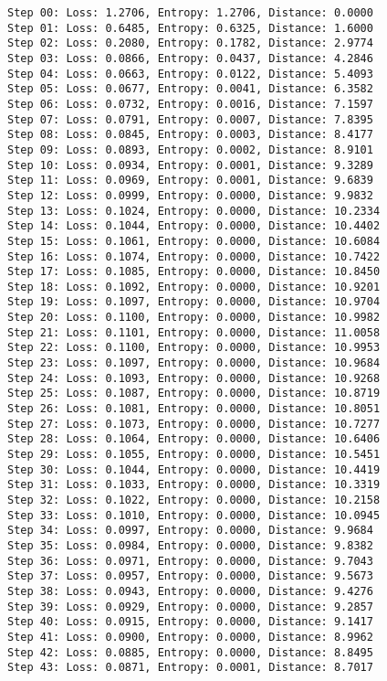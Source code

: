 \documentclass[11pt]{article}
\begin{document}
    \begin{Verbatim}[commandchars=\\\{\}]
Step 00: Loss: 1.2706, Entropy: 1.2706, Distance: 0.0000
Step 01: Loss: 0.6485, Entropy: 0.6325, Distance: 1.6000
Step 02: Loss: 0.2080, Entropy: 0.1782, Distance: 2.9774
Step 03: Loss: 0.0866, Entropy: 0.0437, Distance: 4.2846
Step 04: Loss: 0.0663, Entropy: 0.0122, Distance: 5.4093
Step 05: Loss: 0.0677, Entropy: 0.0041, Distance: 6.3582
Step 06: Loss: 0.0732, Entropy: 0.0016, Distance: 7.1597
Step 07: Loss: 0.0791, Entropy: 0.0007, Distance: 7.8395
Step 08: Loss: 0.0845, Entropy: 0.0003, Distance: 8.4177
Step 09: Loss: 0.0893, Entropy: 0.0002, Distance: 8.9101
Step 10: Loss: 0.0934, Entropy: 0.0001, Distance: 9.3289
Step 11: Loss: 0.0969, Entropy: 0.0001, Distance: 9.6839
Step 12: Loss: 0.0999, Entropy: 0.0000, Distance: 9.9832
Step 13: Loss: 0.1024, Entropy: 0.0000, Distance: 10.2334
Step 14: Loss: 0.1044, Entropy: 0.0000, Distance: 10.4402
Step 15: Loss: 0.1061, Entropy: 0.0000, Distance: 10.6084
Step 16: Loss: 0.1074, Entropy: 0.0000, Distance: 10.7422
Step 17: Loss: 0.1085, Entropy: 0.0000, Distance: 10.8450
Step 18: Loss: 0.1092, Entropy: 0.0000, Distance: 10.9201
Step 19: Loss: 0.1097, Entropy: 0.0000, Distance: 10.9704
Step 20: Loss: 0.1100, Entropy: 0.0000, Distance: 10.9982
Step 21: Loss: 0.1101, Entropy: 0.0000, Distance: 11.0058
Step 22: Loss: 0.1100, Entropy: 0.0000, Distance: 10.9953
Step 23: Loss: 0.1097, Entropy: 0.0000, Distance: 10.9684
Step 24: Loss: 0.1093, Entropy: 0.0000, Distance: 10.9268
Step 25: Loss: 0.1087, Entropy: 0.0000, Distance: 10.8719
Step 26: Loss: 0.1081, Entropy: 0.0000, Distance: 10.8051
Step 27: Loss: 0.1073, Entropy: 0.0000, Distance: 10.7277
Step 28: Loss: 0.1064, Entropy: 0.0000, Distance: 10.6406
Step 29: Loss: 0.1055, Entropy: 0.0000, Distance: 10.5451
Step 30: Loss: 0.1044, Entropy: 0.0000, Distance: 10.4419
Step 31: Loss: 0.1033, Entropy: 0.0000, Distance: 10.3319
Step 32: Loss: 0.1022, Entropy: 0.0000, Distance: 10.2158
Step 33: Loss: 0.1010, Entropy: 0.0000, Distance: 10.0945
Step 34: Loss: 0.0997, Entropy: 0.0000, Distance: 9.9684
Step 35: Loss: 0.0984, Entropy: 0.0000, Distance: 9.8382
Step 36: Loss: 0.0971, Entropy: 0.0000, Distance: 9.7043
Step 37: Loss: 0.0957, Entropy: 0.0000, Distance: 9.5673
Step 38: Loss: 0.0943, Entropy: 0.0000, Distance: 9.4276
Step 39: Loss: 0.0929, Entropy: 0.0000, Distance: 9.2857
Step 40: Loss: 0.0915, Entropy: 0.0000, Distance: 9.1417
Step 41: Loss: 0.0900, Entropy: 0.0000, Distance: 8.9962
Step 42: Loss: 0.0885, Entropy: 0.0000, Distance: 8.8495
Step 43: Loss: 0.0871, Entropy: 0.0001, Distance: 8.7017

\end{Verbatim}
\end{document}

